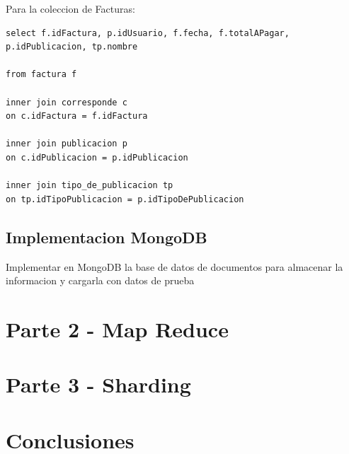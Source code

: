 \documentclass[a4paper, 10pt, twoside]{article}
\begin{document}
Para la coleccion de Facturas:
\begin{verbatim}
select f.idFactura, p.idUsuario, f.fecha, f.totalAPagar, p.idPublicacion, tp.nombre

from factura f

inner join corresponde c
on c.idFactura = f.idFactura

inner join publicacion p
on c.idPublicacion = p.idPublicacion

inner join tipo_de_publicacion tp
on tp.idTipoPublicacion = p.idTipoDePublicacion

\end{verbatim}

\subsection{Implementacion MongoDB}
Implementar en MongoDB la base de datos de documentos para almacenar la informacion y cargarla con datos
de prueba
\section{Parte 2 - Map Reduce}

\section{Parte 3 - Sharding}

\section{Conclusiones}
\end{document}
